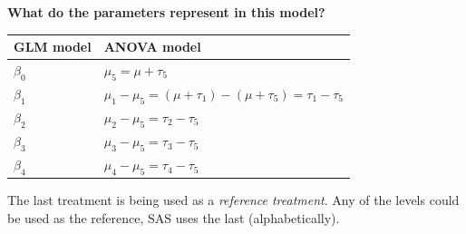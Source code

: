 \newpage

\textbf{What do the parameters represent in this model?}\\
\begin{center}
\begin{tabular}{l|l}
GLM model & ANOVA model \\\hline
$\beta_0$ & $\mu_5=\mu+\tau_5$\\
$\beta_1$ & $\mu_1-\mu_5=(\mu+\tau_1)-(\mu+\tau_5)=\tau_1-\tau_5$\\
$\beta_2$ & $\mu_2-\mu_5=\tau_2-\tau_5$\\
$\beta_3$ & $\mu_3-\mu_5=\tau_3-\tau_5$\\
$\beta_4$ & $\mu_4-\mu_5=\tau_4-\tau_5$\\
\end{tabular}
\end{center}
The last treatment is being used as a \textit{reference treatment}.  Any of the levels could be used as the reference, SAS uses the last (alphabetically).\\~\\


